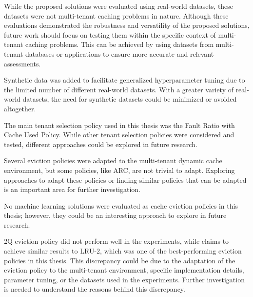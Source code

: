 While the proposed solutions were evaluated using real-world datasets, these datasets were not 
multi-tenant caching problems in nature. Although these evaluations demonstrated 
the robustness and versatility of the proposed solutions, future work should focus on testing 
them within the specific context of multi-tenant caching problems. This can be achieved by 
using datasets from multi-tenant databases or applications to ensure more accurate and 
relevant assessments.

Synthetic data was added to facilitate generalized hyperparameter tuning due to the limited 
number of different real-world datasets. With a greater variety of real-world datasets, the 
need for synthetic datasets could be minimized or avoided altogether.

The main tenant selection policy used in this thesis was the Fault Ratio with Cache Used Policy. 
While other tenant selection policies were considered and tested, different approaches could be 
explored in future research.

Several eviction policies were adapted to the multi-tenant dynamic cache environment, but some 
policies, like ARC, are not trivial to adapt. Exploring approaches to adapt these policies or 
finding similar policies that can be adapted is an important area for further investigation.

No machine learning solutions were evaluated as cache eviction policies in this thesis; 
however, they could be an interesting approach to explore in future research.

2Q eviction policy did not perform well in the experiments, while \cite{2q-article} claims to 
achieve similar results to LRU-2, which was one of the best-performing eviction policies in
this thesis. This discrepancy could be due to the adaptation of the eviction policy to the
multi-tenant environment, specific implementation details, parameter tuning, or the datasets
used in the experiments. Further investigation is needed to understand the reasons behind this
discrepancy.

